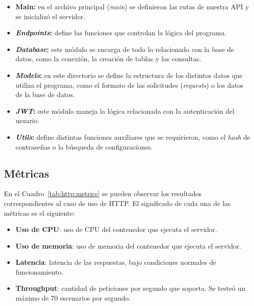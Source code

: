 \documentclass[11pt]{article}
\let\Oldsubsection\subsection
\renewcommand{\subsection}{\FloatBarrier\Oldsubsection}
\newcommand{\english}[1]{\textit{#1}}
\begin{document}
\begin{itemize}
    \item \textbf{Main:} en el archivo principal (\textit{main}) se definieron las rutas de nuestra API y se inicializó el servidor.
    
    \item \textbf{\textit{Endpoints}:} define las funciones que controlan la lógica del programa.
    
    \item \textbf{\textit{Database}:} este módulo se encarga de todo lo relacionado con la base de datos, como la conexión, la creación de tablas y las consultas.
    
    \item \textbf{\textit{Models}:} en este directorio se define la estructura de los distintos datos que utiliza el programa, como el formato de las solicitudes (\english{requests}) o los datos de la base de datos.
    
    \item \textbf{\textit{JWT}:} este módulo maneja la lógica relacionada con la autenticación del usuario.
    
    \item \textbf{\textit{Utils}:} define distintas funciones auxiliares que se requirieron, como el \english{hash} de contraseñas o la búsqueda de configuraciones.
\end{itemize}

\subsection{Métricas}

En el Cuadro~\ref{tab:http:metrics} se pueden observar los resultados correspondientes al caso de uso de HTTP. El significado de cada una de las métricas es el siguiente:

\begin{itemize}
    \item \textbf{Uso de CPU}: uso de CPU del contenedor que ejecuta el servidor.
    \item \textbf{Uso de memoria}: uso de memoria del contenedor que ejecuta el servidor.
    \item \textbf{Latencia}: latencia de las respuestas, bajo condiciones normales de funcionamiento.
    \item \textbf{Throughput}: cantidad de peticiones por segundo que soporta. Se testeó un máximo de 70 escenarios por segundo.
\end{itemize}
\end{document}
